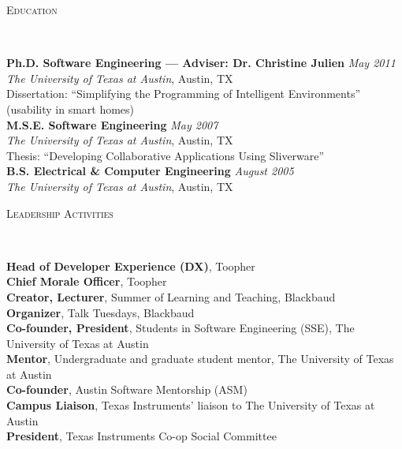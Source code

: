 \documentclass[9pt]{article}
\newenvironment{changemargin}[2]{%
  \begin{list}{}{%
    \setlength{\topsep}{0pt}%
    \setlength{\leftmargin}{#1}%
    \setlength{\rightmargin}{#2}%
    \setlength{\listparindent}{\parindent}%
    \setlength{\itemindent}{\parindent}%
    \setlength{\parsep}{\parskip}%
  }%
  \item[]}{\end{list}
}
\newcommand{\lineover}{
	\begin{changemargin}{-0.05in}{-0.05in}
		\vspace*{-8pt}
		\hrulefill \\
		\vspace*{-2pt}
	\end{changemargin}
}
\newcommand{\header}[1]{
	\begin{changemargin}{-0.5in}{-0.5in}
		\scshape{#1}\\
  	\lineover
	\end{changemargin}
}
\newenvironment{body} {
	\vspace*{-16pt}
	\begin{changemargin}{-0.25in}{-0.5in}
  }	
	{\end{changemargin}
}
\begin{document}
\medskip


\header{Education}

\begin{body}
	\vspace{14pt}
	\textbf{Ph.D. Software Engineering --- Adviser: Dr. Christine Julien}{} \hfill \emph{May 2011}{} \\
	\emph{The University of Texas at Austin}, Austin, TX{} \\
	Dissertation: ``Simplifying the Programming of Intelligent Environments'' (usability in smart homes)\\
  \medskip
	\textbf{M.S.E. Software Engineering}{} \hfill \emph{May 2007}{} \\
	\emph{The University of Texas at Austin}, Austin, TX{} \\
	Thesis: ``Developing Collaborative Applications Using Sliverware''\\
  \medskip
	\textbf{B.S. Electrical \& Computer Engineering} \hfill \emph{August 2005} \\
	\emph{The University of Texas at Austin}, Austin, TX\\
\end{body}

\medskip


\header{Leadership Activities}

\begin{body}
	\vspace{14pt}
	\textbf{Head of Developer Experience (DX)}, Toopher\\
	\medskip
	\textbf{Chief Morale Officer}, Toopher\\
	\medskip
	\textbf{Creator, Lecturer}, Summer of Learning and Teaching, Blackbaud\\
	\medskip
	\textbf{Organizer}, Talk Tuesdays, Blackbaud\\
	\medskip
	\textbf{Co-founder, President}, Students in Software Engineering (SSE), The University of Texas at Austin\\
	\medskip
	\textbf{Mentor}, Undergraduate and graduate student mentor, The University of Texas at Austin\\
	\medskip
	\textbf{Co-founder}, Austin Software Mentorship (ASM)\\
	\medskip
	\textbf{Campus Liaison}, Texas Instruments' liaison to The University of Texas at Austin\\
	\medskip
	\textbf{President}, Texas Instruments Co-op Social Committee\\
\end{body}
\end{document}

